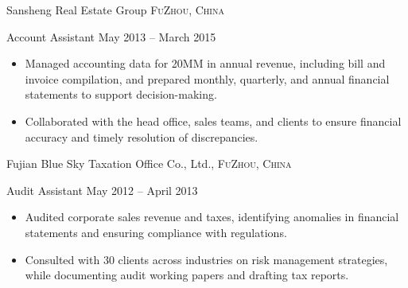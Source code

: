 \documentclass[10pt,a4paper]{article}
\begin{document}
\headedsection
{Sansheng Real Estate Group}
{{\small \textsc{FuZhou, China}}}
{
  \headedsubsection
  {Account Assistant}
  {May 2013 – March 2015}
  {
    \begin{itemize}
      \item Managed accounting data for 20MM in annual revenue, including bill and invoice compilation, and prepared monthly, quarterly, and annual financial statements to support decision-making.
      \item Collaborated with the head office, sales teams, and clients to ensure financial accuracy and timely resolution of discrepancies.
    \end{itemize}
  }
}

\headedsection
{Fujian Blue Sky Taxation Office Co., Ltd.,}
{{\small \textsc{FuZhou, China}}}
{
  \headedsubsection
  {Audit Assistant}
  {May 2012 – April 2013}
  {
    \begin{itemize}
      \item Audited corporate sales revenue and taxes, identifying anomalies in financial statements and ensuring compliance with regulations.
      \item Consulted with 30 clients across industries on risk management strategies, while documenting audit working papers and drafting tax reports.
    \end{itemize}
  }
}



\end{document}

